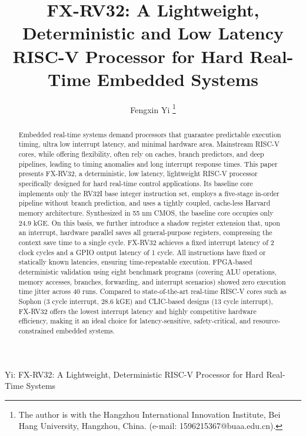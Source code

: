 \documentclass[letterpaper,journal]{IEEEtran}
\begin{document}
\title{FX-RV32: A Lightweight, Deterministic and Low Latency RISC-V Processor for Hard Real-Time Embedded Systems}

\author{Fengxin Yi
\thanks{The author is with the Hangzhou International Innovation Institute, Bei Hang University, Hangzhou, China. (e-mail: 1596215367@buaa.edu.cn).}%
}

%
{Yi: FX-RV32: A Lightweight, Deterministic RISC-V Processor for Hard Real-Time Systems}

\maketitle

\begin{abstract}
Embedded real-time systems demand processors that guarantee predictable execution timing, ultra low interrupt latency, and minimal hardware area.
Mainstream RISC-V cores, while offering flexibility, often rely on caches, branch predictors, and deep pipelines, leading to timing anomalies and long interrupt response times.
This paper presents FX-RV32, a deterministic, low latency, lightweight RISC-V processor specifically designed for hard real-time control applications.
Its baseline core implements only the RV32I base integer instruction set, employs a five-stage in-order pipeline without branch prediction, and uses a tightly coupled, cache-less Harvard memory architecture.
Synthesized in 55 nm CMOS, the baseline core occupies only 24.9 kGE.
On this basis, we further introduce a shadow register extension that, upon an interrupt, hardware parallel saves all general-purpose registers, compressing the context save time to a single cycle.
FX-RV32 achieves a fixed interrupt latency of 2 clock cycles and a GPIO output latency of 1 cycle.
All instructions have fixed or statically known latencies, ensuring time-repeatable execution.
FPGA‑based deterministic validation using eight benchmark programs (covering ALU operations, memory accesses, branches, forwarding, and interrupt scenarios) showed zero execution time jitter across 40 runs.
Compared to state-of-the-art real-time RISC-V cores such as Sophon (3 cycle interrupt, 28.6 kGE) and CLIC-based designs (13 cycle interrupt), FX-RV32 offers the lowest interrupt latency and highly competitive hardware efficiency, making it an ideal choice for latency-sensitive, safety-critical, and resource-constrained embedded systems.
\end{abstract}
\end{document}

